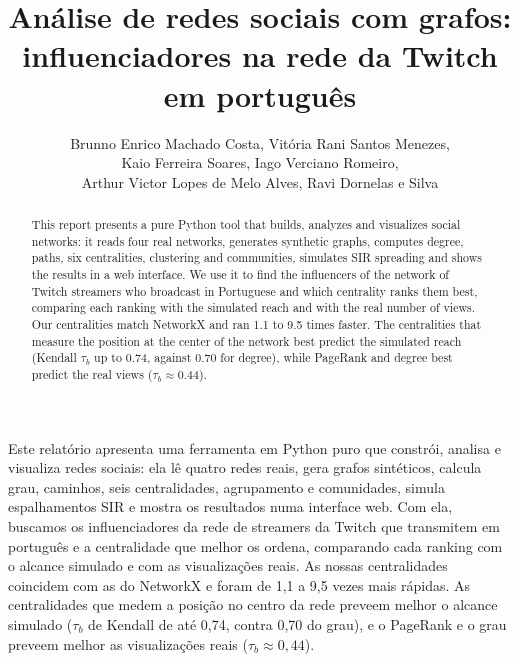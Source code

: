 \documentclass[12pt]{article}
\title{Análise de redes sociais com grafos:\\
       influenciadores na rede da Twitch em português}
\author{Brunno Enrico Machado Costa\inst{1}, Vitória Rani Santos Menezes\inst{1},\\
  Kaio Ferreira Soares\inst{1}, Iago Verciano Romeiro\inst{1},\\
  Arthur Victor Lopes de Melo Alves\inst{1}, Ravi Dornelas e Silva\inst{1}}
\begin{document}
\maketitle

\begin{abstract}
  This report presents a pure Python tool that builds, analyzes and visualizes social networks:
  it reads four real networks, generates synthetic graphs, computes degree, paths, six
  centralities, clustering and communities, simulates SIR spreading and shows the results in a
  web interface. We use it to find the influencers of the network of Twitch streamers who
  broadcast in Portuguese and which centrality ranks them best, comparing each ranking with the
  simulated reach and with the real number of views. Our centralities match NetworkX and ran 1.1 to
  9.5 times faster. The centralities that measure the position at the center of the network best
  predict the simulated reach (Kendall
  $\tau_b$ up to 0.74, against 0.70 for degree), while PageRank and degree best predict the real
  views ($\tau_b \approx 0.44$).
\end{abstract}

\begin{resumo}
  Este relatório apresenta uma ferramenta em Python puro que constrói, analisa e visualiza redes
  sociais: ela lê quatro redes reais, gera grafos sintéticos, calcula grau, caminhos, seis
  centralidades, agrupamento e comunidades, simula espalhamentos SIR e mostra os resultados numa
  interface web. Com ela, buscamos os influenciadores da rede de streamers da Twitch que
  transmitem em português e a centralidade que melhor os ordena, comparando cada ranking com o
  alcance simulado e com as visualizações reais. As nossas centralidades coincidem com as do
  NetworkX e foram de 1,1 a 9,5 vezes mais rápidas. As centralidades que medem a posição no centro
  da rede preveem melhor o alcance simulado ($\tau_b$
  de Kendall de até 0,74, contra 0,70 do grau), e o PageRank e o grau preveem melhor as
  visualizações reais ($\tau_b \approx 0{,}44$).
\end{resumo}




\end{document}
